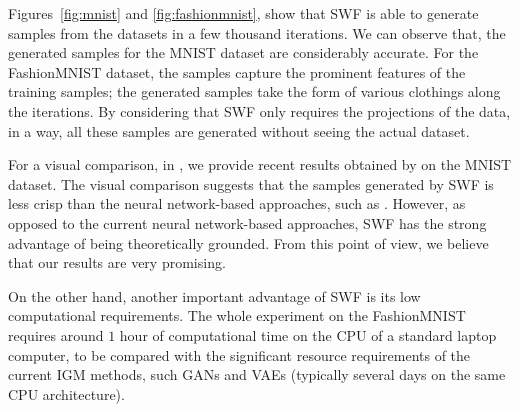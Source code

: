 Figures~\ref{fig:mnist} and \ref{fig:fashionmnist}, show that SWF is able to generate samples from the datasets in a few thousand iterations. We can observe that, the generated samples for the MNIST dataset are considerably accurate. For the FashionMNIST dataset, the samples capture the prominent features of the training samples; the generated samples take the form of various clothings along the iterations. By considering that SWF only requires the projections of the data, in a way, all these samples are generated without seeing the actual dataset.

For a visual comparison, in \supp{}, we provide recent results obtained by \cite{deshpande2018generative} on the MNIST dataset. The visual comparison suggests that the samples generated by SWF is less crisp than the neural network-based approaches, such as \cite{goodfellow2014generative,arjovsky2017wasserstein,deshpande2018generative}. However, as opposed to the current neural network-based approaches, SWF has the strong advantage of being theoretically grounded. From this point of view, we believe that our results are very promising. 




On the other hand, another important advantage of SWF is its low computational requirements. The whole experiment on the FashionMNIST requires around $1$ hour of computational time on the CPU of a standard laptop computer, to be compared with the significant resource requirements of the current IGM methods, such GANs and VAEs (typically several days on the same CPU architecture).




















